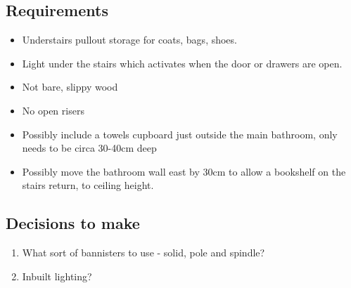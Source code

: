 \subsection{Requirements}
\begin{itemize}
\item Understairs pullout storage for coats, bags, shoes.
\item Light under the stairs which activates when the door or drawers are open.
\item Not bare, slippy wood
\item No open risers
\item Possibly include a towels cupboard just outside the main bathroom, only needs to be circa 30-40cm deep
\item Possibly move the bathroom wall east by 30cm to allow a bookshelf on the stairs return, to ceiling height.
\end{itemize}

\subsection{Decisions to make}
\begin{enumerate}
\item What sort of bannisters to use - solid, pole and spindle?
\item Inbuilt lighting? 
\end{enumerate}
